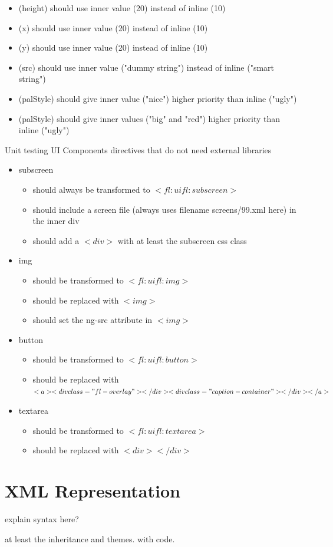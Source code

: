 \begin{itemize}
\begin{itemize}
			\item (height) should use inner value (20) instead of inline (10)
			\item (x) should use inner value (20) instead of inline (10)
			\item (y) should use inner value (20) instead of inline (10)
			\item (src) should use inner value ("dummy string") instead of inline ("smart string")
			\item (palStyle) should give inner value ("nice") higher priority than inline ("ugly")
			\item (palStyle) should give inner values ("big" and "red") higher priority than inline ("ugly")
		\end{itemize}
\end{itemize}

Unit testing UI Components directives that do not need external libraries
\begin{itemize}
	\item subscreen
	\begin{itemize}
    	\item should always be transformed to $<fl:ui fl:subscreen>$
   	 	\item should include a screen file (always uses filename screens/99.xml here) in the inner div
    	\item should add a $<div>$ with at least the subscreen css class
	\end{itemize}

	\item img
	\begin{itemize}
    \item should be transformed to $<fl:ui fl:img>$
    \item should be replaced with $<img>$
    \item should set the ng-src attribute in $<img>$
	\end{itemize}

	\item button
	\begin{itemize}
    \item should be transformed to $<fl:ui fl:button>$
    \item should be replaced with $<a><div class="fl-overlay"></div><div class="caption-container"></div></a>$
	\end{itemize}

	\item textarea
	\begin{itemize}
    \item should be transformed to $<fl:ui fl:textarea>$
    \item should be replaced with $<div></div>$
	\end{itemize}

\end{itemize}


\section{XML Representation}
explain syntax here?

at least the inheritance and themes. with code.
